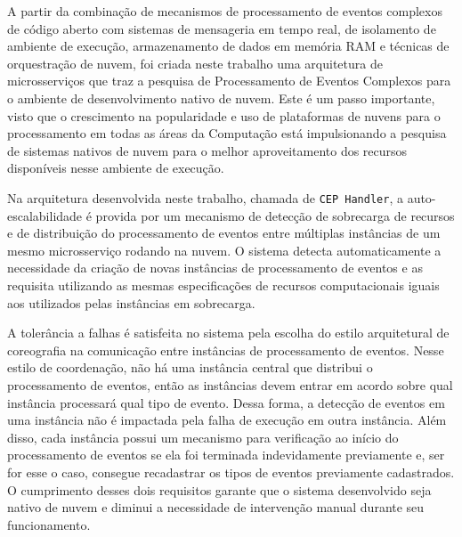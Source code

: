 A partir da combinação de mecanismos de processamento de eventos complexos de código aberto com sistemas de mensageria em tempo real, de isolamento de ambiente de execução, armazenamento de dados em memória RAM e técnicas de orquestração de nuvem, foi criada neste trabalho uma arquitetura de microsserviços que traz a pesquisa de Processamento de Eventos Complexos para o ambiente de desenvolvimento nativo de nuvem. Este é um passo importante, visto que o crescimento na popularidade e uso de plataformas de nuvens para o processamento em todas as áreas da Computação está impulsionando a pesquisa de sistemas nativos de nuvem para o melhor aproveitamento dos recursos disponíveis nesse ambiente de execução.

Na arquitetura desenvolvida neste trabalho, chamada de \texttt{CEP Handler}, a auto-escalabilidade é provida por um mecanismo de detecção de sobrecarga de recursos e de distribuição do processamento de eventos entre múltiplas instâncias de um mesmo microsserviço rodando na nuvem. O sistema detecta automaticamente a necessidade da criação de novas instâncias de processamento de eventos e as requisita utilizando as mesmas especificações de recursos computacionais iguais aos utilizados pelas instâncias em sobrecarga. 

A tolerância a falhas é satisfeita no sistema pela escolha do estilo arquitetural de coreografia na comunicação entre instâncias de processamento de eventos. Nesse estilo de coordenação, não há uma instância central que distribui o processamento de eventos, então as instâncias devem entrar em acordo sobre qual instância processará qual tipo de evento. Dessa forma, a detecção de eventos em uma instância não é impactada pela falha de execução em outra instância. Além disso, cada instância possui um mecanismo para verificação ao início do processamento de eventos se ela foi terminada indevidamente previamente e, ser for esse o caso, consegue recadastrar os tipos de eventos previamente cadastrados. O cumprimento desses dois requisitos garante que o sistema desenvolvido seja nativo de nuvem e diminui a necessidade de intervenção manual durante seu funcionamento. %

